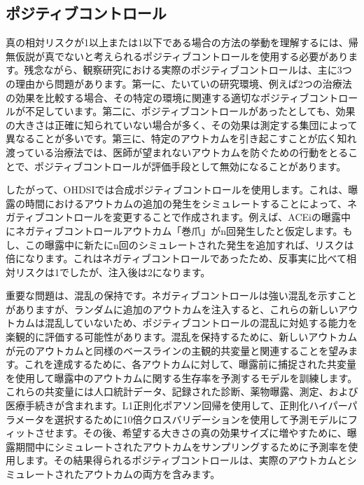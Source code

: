 \documentclass[
  11pt]{book}
\theoremstyle{definition}
\theoremstyle{definition}
\theoremstyle{definition}
\theoremstyle{definition}
\theoremstyle{remark}
\begin{document}
\subsection{ポジティブコントロール}\label{PositiveControls}


真の相対リスクが1以上または1以下である場合の方法の挙動を理解するには、帰無仮説が真でないと考えられるポジティブコントロールを使用する必要があります。残念ながら、観察研究における実際のポジティブコントロールは、主に3つの理由から問題があります。第一に、たいていの研究環境、例えば2つの治療法の効果を比較する場合、その特定の環境に関連する適切なポジティブコントロールが不足しています。第二に、ポジティブコントロールがあったとしても、効果の大きさは正確に知られていない場合が多く、その効果は測定する集団によって異なることが多いです。第三に、特定のアウトカムを引き起こすことが広く知れ渡っている治療法では、医師が望まれないアウトカムを防ぐための行動をとることで、ポジティブコントロールが評価手段として無効になることがあります。\citep{noren_2014}


したがって、OHDSIでは合成ポジティブコントロールを使用します。これは、曝露の時間におけるアウトカムの追加の発生をシミュレートすることによって、ネガティブコントロールを変更することで作成されます。例えば、ACEiの曝露中にネガティブコントロールアウトカム「巻爪」がn回発生したと仮定します。もし、この曝露中に新たにn回のシミュレートされた発生を追加すれば、リスクは倍になります。これはネガティブコントロールであったため、反事実に比べて相対リスクは1でしたが、注入後は2になります。

重要な問題は、混乱の保持です。ネガティブコントロールは強い混乱を示すことがありますが、ランダムに追加のアウトカムを注入すると、これらの新しいアウトカムは混乱していないため、ポジティブコントロールの混乱に対処する能力を楽観的に評価する可能性があります。混乱を保持するために、新しいアウトカムが元のアウトカムと同様のベースラインの主観的共変量と関連することを望みます。これを達成するために、各アウトカムに対して、曝露前に捕捉された共変量を使用して曝露中のアウトカムに関する生存率を予測するモデルを訓練します。これらの共変量には人口統計データ、記録された診断、薬物曝露、測定、および医療手続きが含まれます。L1正則化ポアソン回帰\citep{suchard_2013}を使用して、正則化ハイパーパラメータを選択するために10倍クロスバリデーションを使用して予測モデルにフィットさせます。その後、希望する大きさの真の効果サイズに増やすために、曝露期間中にシミュレートされたアウトカムをサンプリングするために予測率を使用します。その結果得られるポジティブコントロールは、実際のアウトカムとシミュレートされたアウトカムの両方を含みます。
\end{document}

